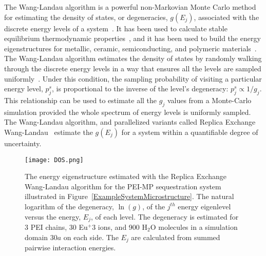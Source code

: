 \documentclass[
journal=jcisd8, %
manuscript=article,
layout=twocolumn   %
]{achemso}
\begin{document}
The Wang-Landau algorithm is a powerful non-Markovian Monte Carlo method for estimating the density of states, or degeneracies, $g(E_j)$, associated with the discrete energy levels of a system~\cite{Li2014, Vogel2013, WangLandau2001a, WangLandau2001b}. 
It has been used to calculate stable equilibrium thermodynamic properties~\cite{Wust2012, Farris2019}, and it has been used to build the energy eigenstructures for metallic, ceramic, semiconducting, and polymeric materials~\cite{McDonald2022,Younis2022,McDonald2023polymer}. The Wang-Landau algorithm estimates the density of states by randomly walking through the discrete energy levels in a way that ensures all the levels are sampled uniformly~\cite{LandauTsaiExler2004}.  Under this condition, the sampling probability of visiting a particular energy level, $p_j^s$, is proportional to the inverse of the level's degeneracy: $p_j^s \propto 1/g_j$. This relationship can be used to estimate all the $g_j$ values from a Monte-Carlo simulation provided the whole spectrum of energy levels is uniformly sampled. The Wang-Landau algorithm, and parallelized variants called Replica Exchange Wang-Landau~\cite{Li2014, Vogel2013, WangLandau2001a, WangLandau2001b, LandauTsaiExler2004, Wust2012, Farris2019, Vogel2013, Vogel2014, Vogel2018} estimate the $g(E_j)$ for a system within a quantifiable degree of uncertainty.

\begin{figure}[ht!]
	\begin{center}
			\texttt{[image: DOS.png]}
		\caption{The energy eigenstructure estimated with the Replica Exchange Wang-Landau algorithm for the PEI-MP sequestration system illustrated in Figure~\ref{ExampleSystemMicrostructure}. The natural logarithm of the degeneracy, $\ln(g)$, of the $j^{th}$ energy eigenlevel versus the energy, $E_j$, of each level. The degeneracy is estimated for 3 PEI chains, 30 Eu$^+3$ ions, and 900 H$_2$O molecules in a simulation domain $30a$ on each side. The $E_j$ are calculated from summed pairwise interaction energies.}
		\label{DOS}
	\end{center}
\end{figure}
\end{document}
